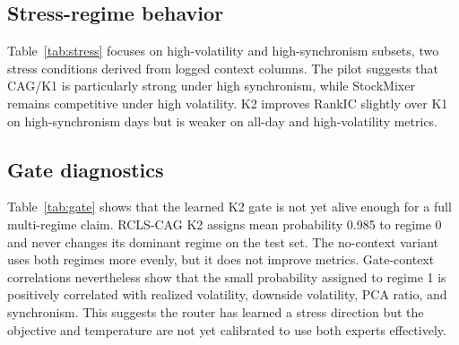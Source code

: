 \documentclass{article}
\begin{document}
\subsection{Stress-regime behavior}

Table~\ref{tab:stress} focuses on high-volatility and high-synchronism subsets, two stress conditions derived from logged context columns. The pilot suggests that CAG/K1 is particularly strong under high synchronism, while StockMixer remains competitive under high volatility. K2 improves RankIC slightly over K1 on high-synchronism days but is weaker on all-day and high-volatility metrics.

\begin{table}[t]
\centering
\caption{Stress subset metrics for selected models.}
\label{tab:stress}
\end{table}

\subsection{Gate diagnostics}

Table~\ref{tab:gate} shows that the learned K2 gate is not yet alive enough for a full multi-regime claim. RCLS-CAG K2 assigns mean probability 0.985 to regime 0 and never changes its dominant regime on the test set. The no-context variant uses both regimes more evenly, but it does not improve metrics. Gate-context correlations nevertheless show that the small probability assigned to regime 1 is positively correlated with realized volatility, downside volatility, PCA ratio, and synchronism. This suggests the router has learned a stress direction but the objective and temperature are not yet calibrated to use both experts effectively.
\end{document}
